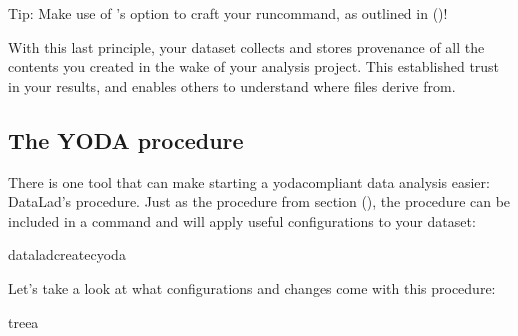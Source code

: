 \sphinxAtStartPar
Tip: Make use of ’s  option to craft your run\sphinxhyphen{}command, as outlined in {\hyperref[\detokenize{basics/101-110-run2:dryrun}]{}} ()!

\sphinxAtStartPar
With this last principle, your dataset collects and stores provenance
of all the contents you created in the wake of your analysis project.
This established trust in your results, and enables others to understand
where files derive from.


\subsection{The YODA procedure}
\label{\detokenize{basics/101-127-yoda:the-yoda-procedure}}\label{\detokenize{basics/101-127-yoda:yodaproc}}
\sphinxAtStartPar
There is one tool that can make starting a yoda\sphinxhyphen{}compliant data analysis
easier: DataLad’s  procedure. Just as the  procedure
from section {\hyperref[\detokenize{basics/101-101-create:createds}]{}} (), the  procedure can be included in a
 command and will apply useful configurations
to your dataset:

\begin{sphinxVerbatim}[commandchars=\\\{\}]
dataladcreate\PYGZhy{}cyoda
\end{sphinxVerbatim}

\sphinxAtStartPar
Let’s take a look at what configurations and changes come with this procedure:

\begin{sphinxVerbatim}[commandchars=\\\{\}]
tree\PYGZhy{}a

\end{sphinxVerbatim}

